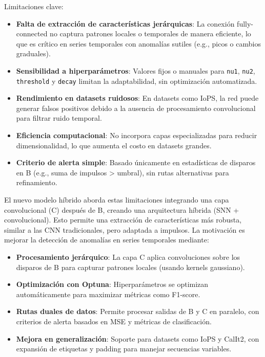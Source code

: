Limitaciones clave:
\begin{itemize}
    \item \textbf{Falta de extracción de características jerárquicas}: La conexión fully-connected no captura patrones locales o temporales de manera eficiente, lo que es crítico en series temporales con anomalías sutiles (e.g., picos o cambios graduales).
    \item \textbf{Sensibilidad a hiperparámetros}: Valores fijos o manuales para \texttt{nu1}, \texttt{nu2}, \texttt{threshold} y \texttt{decay} limitan la adaptabilidad, sin optimización automatizada.
    \item \textbf{Rendimiento en datasets ruidosos}: En datasets como IoPS, la red puede generar falsos positivos debido a la ausencia de procesamiento convolucional para filtrar ruido temporal.
    \item \textbf{Eficiencia computacional}: No incorpora capas especializadas para reducir dimensionalidad, lo que aumenta el costo en datasets grandes.
    \item \textbf{Criterio de alerta simple}: Basado únicamente en estadísticas de disparos en B (e.g., suma de impulsos > umbral), sin rutas alternativas para refinamiento.
\end{itemize}

El nuevo modelo híbrido aborda estas limitaciones integrando una capa convolucional (C) después de B, creando una arquitectura híbrida (SNN + convolucional). Esto permite una extracción de características más robusta, similar a las CNN tradicionales, pero adaptada a impulsos. La motivación es mejorar la detección de anomalías en series temporales mediante:
\begin{itemize}
    \item \textbf{Procesamiento jerárquico}: La capa C aplica convoluciones sobre los disparos de B para capturar patrones locales (usando kernels gaussiano).
    \item \textbf{Optimización con Optuna}: Hiperparámetros se optimizan automáticamente para maximizar métricas como F1-score.
    \item \textbf{Rutas duales de datos}: Permite procesar salidas de B y C en paralelo, con criterios de alerta basados en MSE y métricas de clasificación.
    \item \textbf{Mejora en generalización}: Soporte para datasets como IoPS y CalIt2, con expansión de etiquetas y padding para manejar secuencias variables.
\end{itemize}

